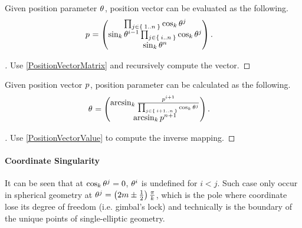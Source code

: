 \documentclass[stu, babel, american, biblatex, a4paper, draftall]{apa7}
\begin{document}
\begin{lemma}\label{PositionVectorValue}
    Given position parameter $\tensor{\theta}{}$, position vector can be evaluated as the following.
    \begin{align*}
        \tensor{p}{} & =
        \begin{pmatrix}
            \prod_{j\in\Set{1..n}}{\cos_k{\tensor{\theta}{^j}}}                                \\
            \sin_k{\tensor{\theta}{^{i-1}}}\prod_{j\in\Set{i..n}}{\cos_k{\tensor{\theta}{^j}}} \\
            \sin_k{{\tensor{\theta}{^n}}}                                                      \\
        \end{pmatrix}\text{.}
    \end{align*}
\end{lemma}
\begin{proof}[]
    \skipped

    Use \cref{PositionVectorMatrix} and recursively compute the vector.
\end{proof}
\begin{lemma}\label{PositionParameterValue}
    Given position vector $\tensor{p}{}$, position parameter can be calculated as the following.
    \begin{align*}
        \tensor{\theta}{} & =
        \begin{pmatrix}
            \arcsin_k{\frac{\tensor{p}{^{i+1}}}{\prod_{j\in\Set{i+1..n}}{\cos_k{\tensor{\theta}{^j}}}}} \\
            \arcsin_k{\tensor{p}{^{n+1}}}                                                               \\
        \end{pmatrix}\text{.}
    \end{align*}
\end{lemma}
\begin{proof}[]
    \skipped

    Use \cref{PositionVectorValue} to compute the inverse mapping.
\end{proof}
\paragraph{Coordinate Singularity}
    It can be seen that at $\cos_k{\tensor{\theta}{^j}}=0$,
    $\tensor{\theta}{^i}$ is undefined for $i<j$.
    Such case only occur in spherical geometry at $\tensor{\theta}{^j}=\left(2m\pm\frac{1}{2}\right)\frac{\pi}{k}$,
    which is the pole where coordinate lose its degree of freedom (i.e. gimbal's lock)
    and technically is the boundary of the unique points of single-elliptic geometry.
\end{document}
